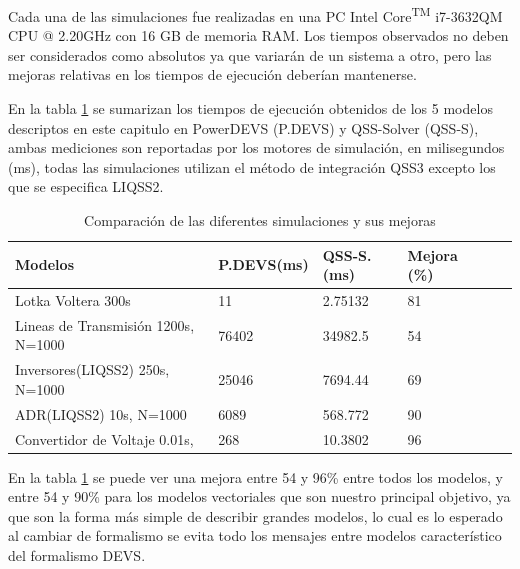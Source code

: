 	Cada una de las simulaciones fue realizadas en una PC Intel\textsuperscript{\textregistered} Core\textsuperscript{TM} i7-3632QM CPU @ 2.20GHz con 16 GB de
	 memoria RAM. Los tiempos observados no deben ser considerados como absolutos ya que variarán de un sistema a otro, pero las mejoras relativas en los tiempos de ejecución deberían mantenerse.

	En la tabla \ref{result} se sumarizan los tiempos de ejecución obtenidos de los 5 modelos descriptos en este capitulo en  
	PowerDEVS (P.DEVS) y QSS-Solver (QSS-S), ambas mediciones son reportadas por los motores de simulación, en milisegundos (ms),
	 todas las simulaciones utilizan el método de integración QSS3 excepto los que se especifica LIQSS2.

\begin{table}[H]
\centering	
\begin{tabular}{llllll}
\toprule
{\bf Modelos}            &  {\bf P.DEVS(ms)} & {\bf QSS-S. (ms)} & {\bf Mejora (\%)} \\
\toprule
Lotka  Voltera 300s      		& 11            & 2.75132         & 81 \\
Lineas de Transmisión 1200s, N=1000     & 76402         & 34982.5         & 54          \\
Inversores(LIQSS2) 250s, N=1000   	& 25046         & 7694.44         & 69        \\
ADR(LIQSS2) 10s, N=1000 		& 6089          & 568.772         & 90        \\
Convertidor de Voltaje 0.01s,        	& 268           & 10.3802         & 96         

\end{tabular}
\label{result}
\caption{Comparación de las diferentes simulaciones y sus mejoras}
\end{table}

	En la tabla \ref{result} se puede ver una mejora entre 54 y 96\% entre todos los modelos, y entre 54 y 90\% para los modelos vectoriales que son nuestro 
	principal objetivo, ya que son la forma más simple de describir grandes modelos, lo cual es lo esperado al cambiar de formalismo se evita todo los 
	mensajes entre modelos característico del formalismo DEVS.
